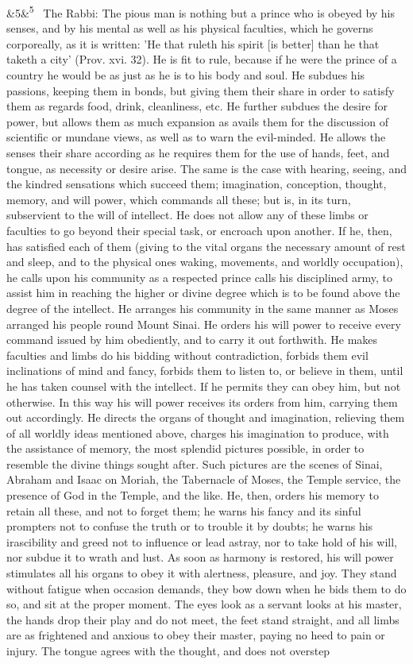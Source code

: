\documentclass[12pt]{article}
\newcommand{\para}[1][]{\par\noindent\ifx&#1&\else\textsuperscript{\footnotesize #1}~\fi}
\begin{document}
\para[5] The Rabbi: The pious man is nothing but a prince who is obeyed by his senses, and by his mental as well as his physical faculties, which he governs corporeally, as it is written: 'He that ruleth his spirit [is better] than he that taketh a city' (Prov. xvi. 32). He is fit to rule, because if he were the prince of a country he would be as just as he is to his body and soul. He subdues his passions, keeping them in bonds, but giving them their share in order to satisfy them as regards food, drink, cleanliness, etc. He further subdues the desire for power, but allows them as much expansion as avails them for the discussion of scientific or mundane views, as well as to warn the evil-minded. He allows the senses their share according as he requires them for the use of hands, feet, and tongue, as necessity or desire arise. The same is the case with hearing, seeing, and the kindred sensations which succeed them; imagination, conception, thought, memory, and will power, which commands all these; but is, in its turn, subservient to the will of intellect. He does not allow any of these limbs or faculties to go beyond their special task, or encroach upon another. If he, then, has satisfied each of them (giving to the vital organs the necessary amount of rest and sleep, and to the physical ones waking, movements, and worldly occupation), he calls upon his community as a respected prince calls his disciplined army, to assist him in reaching the higher or divine degree which is to be found above the degree of the intellect. He arranges his community in the same manner as Moses arranged his people round Mount Sinai. He orders his will power to receive every command issued by him obediently, and to carry it out forthwith. He makes faculties and limbs do his bidding without contradiction, forbids them evil inclinations of mind and fancy, forbids them to listen to, or believe in them, until he has taken counsel with the intellect. If he permits they can obey him, but not otherwise. In this way his will power receives its orders from him, carrying them out accordingly. He directs the organs of thought and imagination, relieving them of all worldly ideas mentioned above, charges his imagination to produce, with the assistance of memory, the most splendid pictures possible, in order to resemble the divine things sought after. Such pictures are the scenes of Sinai, Abraham and Isaac on Moriah, the Tabernacle of Moses, the Temple service, the presence of God in the Temple, and the like. He, then, orders his memory to retain all these, and not to forget them; he warns his fancy and its sinful prompters not to confuse the truth or to trouble it by doubts; he warns his irascibility and greed not to influence or lead astray, nor to take hold of his will, nor subdue it to wrath and lust. As soon as harmony is restored, his will power stimulates all his organs to obey it with alertness, pleasure, and joy. They stand without fatigue when occasion demands, they bow down when he bids them to do so, and sit at the proper moment. The eyes look as a servant looks at his master, the hands drop their play and do not meet, the feet stand straight, and all limbs are as frightened and anxious to obey their master, paying no heed to pain or injury. The tongue agrees with the thought, and does not overstep 
\end{document}
